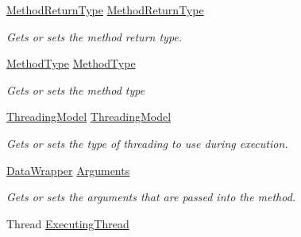 \begin{DoxyCompactItemize}
\item 
\hyperlink{namespace_stand_alone_framework_1_1_factories_1_1_method_factory_a03ffbf0d8e733b86d0ac29ae38dd4241}{Method\+Return\+Type} \hyperlink{class_stand_alone_framework_1_1_factories_1_1_method_factory_1_1_method_wrapper_a51c9c1a1bcf1d278aaed5eecb4d12ca1}{Method\+Return\+Type}
\begin{DoxyCompactList}\small\item\em Gets or sets the method return type. \end{DoxyCompactList}\item 
\hyperlink{namespace_stand_alone_framework_1_1_factories_1_1_method_factory_aeb6e05dc016e73b072faae5a5d275f6a}{Method\+Type} \hyperlink{class_stand_alone_framework_1_1_factories_1_1_method_factory_1_1_method_wrapper_a5f43e091e43ccf5bf9744aa24da0fe43}{Method\+Type}
\begin{DoxyCompactList}\small\item\em Gets or sets the method type \end{DoxyCompactList}\item 
\hyperlink{namespace_stand_alone_framework_1_1_factories_1_1_thread_factory_aaa02326f96ee10b7d0fd360488d27c39}{Threading\+Model} \hyperlink{class_stand_alone_framework_1_1_factories_1_1_method_factory_1_1_method_wrapper_ad81cf5c2f772eea08b0f64ea0032d44b}{Threading\+Model}
\begin{DoxyCompactList}\small\item\em Gets or sets the type of threading to use during execution. \end{DoxyCompactList}\item 
\hyperlink{class_stand_alone_framework_1_1_data_wrapper}{Data\+Wrapper} \hyperlink{class_stand_alone_framework_1_1_factories_1_1_method_factory_1_1_method_wrapper_ab9972e5f2931cf4af0fbf5571a97db6a}{Arguments}
\begin{DoxyCompactList}\small\item\em Gets or sets the arguments that are passed into the method. \end{DoxyCompactList}\item 
Thread \hyperlink{class_stand_alone_framework_1_1_factories_1_1_method_factory_1_1_method_wrapper_a53705992cdbe995cf7099e806ff2b51c}{Executing\+Thread}

\end{DoxyCompactItemize}

